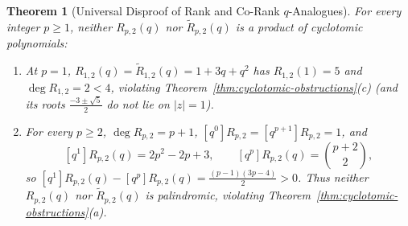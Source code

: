 \documentclass[11pt,a4paper]{article}
\newtheorem{theorem}{Theorem}[section]
\theoremstyle{definition}
\theoremstyle{remark}
\begin{document}
\begin{theorem}[Universal Disproof of Rank and Co-Rank $q$-Analogues]\label{thm:rank-disproof}
For every integer $p \ge 1$, neither $R_{p,2}(q)$ nor $\tilde{R}_{p,2}(q)$ is a product of cyclotomic polynomials:
\begin{enumerate}
  \item[(a)] At $p = 1$, $R_{1,2}(q) = \tilde{R}_{1,2}(q) = 1 + 3q + q^2$ has $R_{1,2}(1) = 5$ and $\deg R_{1,2} = 2 < 4$, violating Theorem~\ref{thm:cyclotomic-obstructions}(c) (and its roots $\frac{-3 \pm \sqrt{5}}{2}$ do not lie on $|z| = 1$).
  \item[(b)] For every $p \ge 2$, $\deg R_{p,2} = p + 1$, $[q^0]R_{p,2} = [q^{p+1}]R_{p,2} = 1$, and
  \begin{equation}\label{eq:rank-coeffs}
    [q^1]R_{p,2}(q) = 2p^2 - 2p + 3, \qquad [q^p]R_{p,2}(q) = \binom{p+2}{2},
  \end{equation}
  so $[q^1]R_{p,2}(q) - [q^p]R_{p,2}(q) = \frac{(p-1)(3p-4)}{2} > 0$. Thus neither $R_{p,2}(q)$ nor $\tilde{R}_{p,2}(q)$ is palindromic, violating Theorem~\ref{thm:cyclotomic-obstructions}(a).
\end{enumerate}
\end{theorem}
\end{document}
